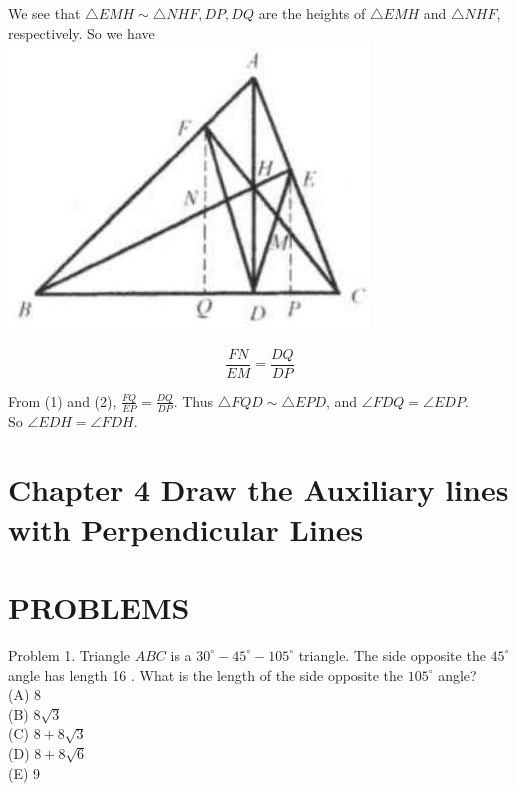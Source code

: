 \documentclass[10pt]{article}
\begin{document}
We see that \(\triangle E M H \sim \triangle N H F, D P, D Q\) are the heights of \(\triangle E M H\) and \(\triangle N H F\), respectively. So we have\\
\includegraphics[max width=\textwidth, center]{2025_04_17_97bc1f7e44d93c271a88g-087(1)}

\[
\frac{F N}{E M}=\frac{D Q}{D P}
\]

From (1) and (2), \(\frac{F Q}{E P}=\frac{D Q}{D P}\). Thus \(\triangle F Q D \sim \triangle E P D\), and \(\angle F D Q=\angle E D P\).\\
So \(\angle E D H=\angle F D H\).

\section*{Chapter 4 Draw the Auxiliary lines with Perpendicular Lines}
\section*{PROBLEMS}
Problem 1. Triangle \(A B C\) is a \(30^{\circ}-45^{\circ}-105^{\circ}\) triangle. The side opposite the \(45^{\circ}\) angle has length 16 . What is the length of the side opposite the \(105^{\circ}\) angle?\\
(A) 8\\
(B) \(8 \sqrt{3}\)\\
(C) \(8+8 \sqrt{3}\)\\
(D) \(8+8 \sqrt{6}\)\\
(E) 9
\end{document}
